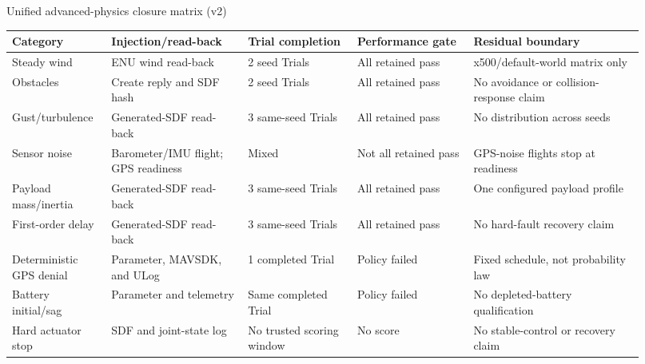 \begin{center}
\begingroup
\footnotesize
\renewcommand{\arraystretch}{1.02}
\setlength{\tabcolsep}{4pt}
\textnormal{Unified advanced-physics closure matrix (v2)}\par
\vspace{0.16em}
\begin{tabular}{@{}L{0.14\linewidth}L{0.20\linewidth}L{0.16\linewidth}L{0.17\linewidth}L{0.25\linewidth}@{}}
\toprule
\textbf{Category} & \textbf{Injection/read-back} & \textbf{Trial completion} &
\textbf{Performance gate} & \textbf{Residual boundary}\tabularnewline
\midrule
Steady wind & ENU wind read-back & 2 seed Trials & All retained pass &
x500/default-world matrix only\tabularnewline
Obstacles & Create reply and SDF hash & 2 seed Trials & All retained pass &
No avoidance or collision-response claim\tabularnewline
Gust/turbulence & Generated-SDF read-back & 3 same-seed Trials &
All retained pass & No distribution across seeds\tabularnewline
Sensor noise & Barometer/IMU flight; GPS readiness & Mixed &
Not all retained pass & GPS-noise flights stop at readiness\tabularnewline
Payload mass/inertia & Generated-SDF read-back & 3 same-seed Trials &
All retained pass & One configured payload profile\tabularnewline
First-order delay & Generated-SDF read-back & 3 same-seed Trials &
All retained pass & No hard-fault recovery claim\tabularnewline
Deterministic GPS denial & Parameter, MAVSDK, and ULog & 1 completed Trial &
Policy failed & Fixed schedule, not probability law\tabularnewline
Battery initial/sag & Parameter and telemetry & Same completed Trial &
Policy failed & No depleted-battery qualification\tabularnewline
Hard actuator stop & SDF and joint-state log & No trusted scoring window &
No score & No stable-control or recovery claim\tabularnewline
\bottomrule
\end{tabular}
\endgroup
\end{center}

